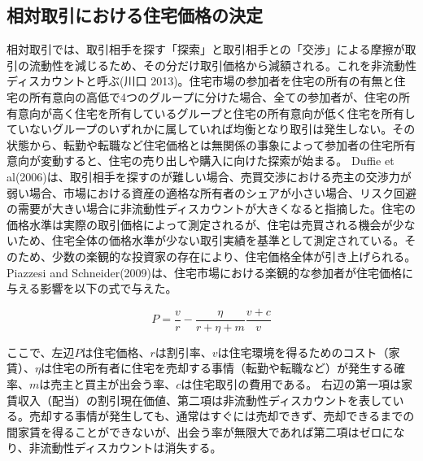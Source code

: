 \documentclass[a4paper,fontsize=11pt,report,notitlepage,line_length=38zw,number_of_lines=40,dvipdfmx]{jlreq}
\begin{document}
\subsection{相対取引における住宅価格の決定}
相対取引では、取引相手を探す「探索」と取引相手との「交渉」による摩擦が取引の流動性を減じるため、その分だけ取引価格から減額される。これを非流動性ディスカウントと呼ぶ(川口 2013)\cite{kawaguchi2013}。住宅市場の参加者を住宅の所有の有無と住宅の所有意向の高低で4つのグループに分けた場合、全ての参加者が、住宅の所有意向が高く住宅を所有しているグループと住宅の所有意向が低く住宅を所有していないグループのいずれかに属していれば均衡となり取引は発生しない。その状態から、転勤や転職など住宅価格とは無関係の事象によって参加者の住宅所有意向が変動すると、住宅の売り出しや購入に向けた探索が始まる。
Duffie et al(2006)\cite{duffie2007}は、取引相手を探すのが難しい場合、売買交渉における売主の交渉力が弱い場合、市場における資産の適格な所有者のシェアが小さい場合、リスク回避の需要が大きい場合に非流動性ディスカウントが大きくなると指摘した。住宅の価格水準は実際の取引価格によって測定されるが、住宅は売買される機会が少ないため、住宅全体の価格水準が少ない取引実績を基準として測定されている。そのため、少数の楽観的な投資家の存在により、住宅価格全体が引き上げられる。Piazzesi and Schneider(2009)\cite{piazzesi2009}は、住宅市場における楽観的な参加者が住宅価格に与える影響を以下の式で与えた。


\begin{equation}
P=\dfrac{v}{r}-\dfrac{\eta}{r+\eta+m}\dfrac{v+c}{v}
\end{equation}

ここで、左辺$P$は住宅価格、$r$は割引率、$v$は住宅環境を得るためのコスト（家賃）、$\eta$は住宅の所有者に住宅を売却する事情（転勤や転職など）が発生する確率、$m$は売主と買主が出会う率、$c$は住宅取引の費用である。
右辺の第一項は家賃収入（配当）の割引現在価値、第二項は非流動性ディスカウントを表している。売却する事情が発生しても、通常はすぐには売却できず、売却できるまでの間家賃を得ることができないが、出会う率が無限大であれば第二項はゼロになり、非流動性ディスカウントは消失する。
\end{document}
